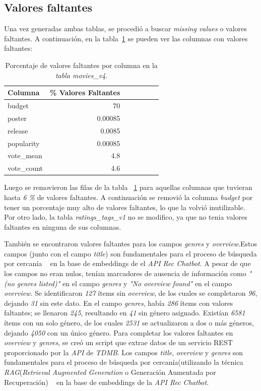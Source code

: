 \documentclass[11pt,a4paper,twoside]{thesis}
\begin{document}
\subsection{Valores faltantes}

Una vez generadas ambas tablas, se procedió a buscar \textit{missing values} o
valores faltantes. A continuación, en la tabla~\ref{table:missing-values} se pueden ver
las columnas con valores faltantes:

\begin{table}[h!]
	\centering
	\footnotesize
	\begin{tabular}{lrrrrrr}
		\hline
		Columna     & \% Valores Faltantes \\
		\hline
		budget      & 70                   \\
		poster      & 0.00085              \\
		release     & 0.0085               \\
		popularity  & 0.00085              \\
		vote\_mean  & 4.8                  \\
		vote\_count & 4.6                  \\
		\hline
	\end{tabular}
	\caption{Porcentaje de valores faltantes por columna en la \textit{tabla movies\_v4}.}
	\label{table:missing-values}
\end{table}

Luego se removieron las filas de la tabla ~\ref{table:missing-values} para aquellas columnas
que tuvieran hasta \textit{6 \%} de valores faltantes. A continuación
se removió la columna \textit{budget} por tener un porcentaje muy alto de
valores faltantes, lo que la volvió inutilizable. Por otro lado, la tabla
\textit{ratings\_tags\_v1} no se modifico, ya que no tenia valores faltantes en
ninguna de sus columnas.


También se encontraron valores faltantes para los campos \textit{genres} y \textit{overview}.Estos campos (junto con el campo \textit{title}) son fundamentales para el proceso de búsqueda por cercanía ~\cite{rag} en la base de embeddings de el \textit{API Rec Chatbot}. A pesar de que los campos no eran nulos, tenían marcadores de ausencia de información como \textit{"(no genres listed)"} en el campo \textit{genres} y \textit{"No overview found"} en el campo \textit{overview}. Se identificaron \textit{127} ítems sin \textit{overview}, de los cuales se completaron \textit{96}, dejando \textit{31} sin este dato. En el campo \textit{genres}, había \textit{286} ítems con valores faltantes; se llenaron \textit{245}, resultando en \textit{41} sin género asignado. Existían \textit{6581} ítems con un solo género, de los cuales \textit{2531} se actualizaron a dos o más géneros, dejando \textit{4050} con un único género. Para completar los valores faltantes en \textit{overview} y \textit{genres}, se creó un script que extrae datos de un servicio REST proporcionado por la \textit{API} de \textit{TDMB}. Los campos \textit{title}, \textit{overview} y \textit{genres} son fundamentales para el proceso de búsqueda por cercanía(utilizando la técnica \textit{RAG}(\textit{Retrieval Augmented Generation} o Generación Aumentada por Recuperación) ~\cite{rag} en la base de embeddings de la \textit{API Rec Chatbot}.
\end{document}
